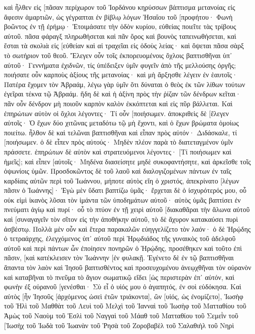 καὶ ἦλθεν εἰς [πᾶσαν περίχωρον τοῦ Ἰορδάνου κηρύσσων βάπτισμα μετανοίας εἰς ἄφεσιν ἁμαρτιῶν, 
ὡς γέγραπται ἐν βίβλῳ λόγων Ἠσαΐου τοῦ [προφήτου· Φωνὴ βοῶντος ἐν τῇ ἐρήμῳ· Ἑτοιμάσατε τὴν ὁδὸν κυρίου, εὐθείας ποιεῖτε τὰς τρίβους αὐτοῦ. 
πᾶσα φάραγξ πληρωθήσεται καὶ πᾶν ὄρος καὶ βουνὸς ταπεινωθήσεται, καὶ ἔσται τὰ σκολιὰ εἰς [εὐθείαν καὶ αἱ τραχεῖαι εἰς ὁδοὺς λείας· 
καὶ ὄψεται πᾶσα σὰρξ τὸ σωτήριον τοῦ θεοῦ. 
Ἔλεγεν οὖν τοῖς ἐκπορευομένοις ὄχλοις βαπτισθῆναι ὑπ᾽ αὐτοῦ· Γεννήματα ἐχιδνῶν, τίς ὑπέδειξεν ὑμῖν φυγεῖν ἀπὸ τῆς μελλούσης ὀργῆς; 
ποιήσατε οὖν καρποὺς ἀξίους τῆς μετανοίας· καὶ μὴ ἄρξησθε λέγειν ἐν ἑαυτοῖς· Πατέρα ἔχομεν τὸν Ἀβραάμ, λέγω γὰρ ὑμῖν ὅτι δύναται ὁ θεὸς ἐκ τῶν λίθων τούτων ἐγεῖραι τέκνα τῷ Ἀβραάμ. 
ἤδη δὲ καὶ ἡ ἀξίνη πρὸς τὴν ῥίζαν τῶν δένδρων κεῖται· πᾶν οὖν δένδρον μὴ ποιοῦν καρπὸν καλὸν ἐκκόπτεται καὶ εἰς πῦρ βάλλεται. 
Καὶ ἐπηρώτων αὐτὸν οἱ ὄχλοι λέγοντες· Τί οὖν [ποιήσωμεν. 
ἀποκριθεὶς δὲ [ἔλεγεν αὐτοῖς· Ὁ ἔχων δύο χιτῶνας μεταδότω τῷ μὴ ἔχοντι, καὶ ὁ ἔχων βρώματα ὁμοίως ποιείτω. 
ἦλθον δὲ καὶ τελῶναι βαπτισθῆναι καὶ εἶπαν πρὸς αὐτόν· Διδάσκαλε, τί [ποιήσωμεν. 
ὁ δὲ εἶπεν πρὸς αὐτούς· Μηδὲν πλέον παρὰ τὸ διατεταγμένον ὑμῖν πράσσετε. 
ἐπηρώτων δὲ αὐτὸν καὶ στρατευόμενοι λέγοντες· [Τί ποιήσωμεν καὶ ἡμεῖς]; καὶ εἶπεν [αὐτοῖς· Μηδένα διασείσητε μηδὲ συκοφαντήσητε, καὶ ἀρκεῖσθε τοῖς ὀψωνίοις ὑμῶν. 
Προσδοκῶντος δὲ τοῦ λαοῦ καὶ διαλογιζομένων πάντων ἐν ταῖς καρδίαις αὐτῶν περὶ τοῦ Ἰωάννου, μήποτε αὐτὸς εἴη ὁ χριστός, 
ἀπεκρίνατο [λέγων πᾶσιν ὁ Ἰωάννης]· Ἐγὼ μὲν ὕδατι βαπτίζω ὑμᾶς· ἔρχεται δὲ ὁ ἰσχυρότερός μου, οὗ οὐκ εἰμὶ ἱκανὸς λῦσαι τὸν ἱμάντα τῶν ὑποδημάτων αὐτοῦ· αὐτὸς ὑμᾶς βαπτίσει ἐν πνεύματι ἁγίῳ καὶ πυρί· 
οὗ τὸ πτύον ἐν τῇ χειρὶ αὐτοῦ [διακαθᾶραι τὴν ἅλωνα αὐτοῦ καὶ [συναγαγεῖν τὸν σῖτον εἰς τὴν ἀποθήκην αὐτοῦ, τὸ δὲ ἄχυρον κατακαύσει πυρὶ ἀσβέστῳ. 
Πολλὰ μὲν οὖν καὶ ἕτερα παρακαλῶν εὐηγγελίζετο τὸν λαόν· 
ὁ δὲ Ἡρῴδης ὁ τετραάρχης, ἐλεγχόμενος ὑπ᾽ αὐτοῦ περὶ Ἡρῳδιάδος τῆς γυναικὸς τοῦ ἀδελφοῦ αὐτοῦ καὶ περὶ πάντων ὧν ἐποίησεν πονηρῶν ὁ Ἡρῴδης, 
προσέθηκεν καὶ τοῦτο ἐπὶ πᾶσιν, [καὶ κατέκλεισεν τὸν Ἰωάννην [ἐν φυλακῇ. 
Ἐγένετο δὲ ἐν τῷ βαπτισθῆναι ἅπαντα τὸν λαὸν καὶ Ἰησοῦ βαπτισθέντος καὶ προσευχομένου ἀνεῳχθῆναι τὸν οὐρανὸν 
καὶ καταβῆναι τὸ πνεῦμα τὸ ἅγιον σωματικῷ εἴδει [ὡς περιστερὰν ἐπ᾽ αὐτόν, καὶ φωνὴν ἐξ οὐρανοῦ [γενέσθαι· Σὺ εἶ ὁ υἱός μου ὁ ἀγαπητός, ἐν σοὶ εὐδόκησα. 
Καὶ αὐτὸς [ἦν Ἰησοῦς [ἀρχόμενος ὡσεὶ ἐτῶν τριάκοντα], ὢν [υἱός, ὡς ἐνομίζετο], Ἰωσὴφ τοῦ Ἠλὶ 
τοῦ Μαθθὰτ τοῦ Λευὶ τοῦ Μελχὶ τοῦ Ἰανναὶ τοῦ Ἰωσὴφ 
τοῦ Ματταθίου τοῦ Ἀμὼς τοῦ Ναοὺμ τοῦ Ἑσλὶ τοῦ Ναγγαὶ 
τοῦ Μάαθ τοῦ Ματταθίου τοῦ Σεμεῒν τοῦ [Ἰωσὴχ τοῦ Ἰωδὰ 
τοῦ Ἰωανὰν τοῦ Ῥησὰ τοῦ Ζοροβαβὲλ τοῦ Σαλαθιὴλ τοῦ Νηρὶ 
